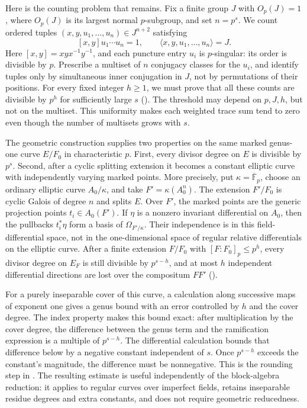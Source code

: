 Here is the counting problem that remains. Fix a finite group $J$ with
$O_p(J)=1$, where $O_p(J)$ is its largest normal $p$-subgroup, and set
$n=p^s$. We count ordered tuples $(x,y,u_1,\ldots,u_n)\in J^{n+2}$
satisfying
\[
 [x,y]u_1\cdots u_n=1,\qquad
 \langle x,y,u_1,\ldots,u_n\rangle=J.
\]
Here $[x,y]=xyx^{-1}y^{-1}$, and each puncture entry $u_i$ is
$p$-singular: its order is divisible by $p$. Prescribe a multiset of
$n$ conjugacy classes for the $u_i$, and identify tuples only by
simultaneous inner conjugation in $J$, not by permutations of their
positions. For every fixed integer $h\geq1$, we must prove that all
these counts are divisible by $p^h$ for sufficiently large $s$
(). The threshold may depend on $p,J,h$,
but not on the multiset. This uniformity makes each weighted trace sum
tend to zero even though the number of multisets grows with $s$.

The geometric construction supplies two properties on the same marked
genus-one curve $E/F_0$ in characteristic $p$. First, every divisor
degree on $E$ is divisible by $p^s$. Second, after a cyclic splitting
extension it becomes a constant elliptic curve with independently
varying marked points. More precisely, put
$\kappa=\overline{\mathbb F}_p$, choose an ordinary elliptic curve
$A_0/\kappa$, and take $F'=\kappa(A_0^n)$. The extension $F'/F_0$
is cyclic Galois of degree $n$ and splits $E$. Over $F'$, the marked points are the
generic projection points $t_i\in A_0(F')$. If $\eta$ is a nonzero
invariant differential on $A_0$, then the pullbacks $t_i^*\eta$
form a basis of $\Omega_{F'/\kappa}$. Their independence is in this
field-differential space, not in the one-dimensional space of regular
relative differentials on the elliptic curve. After a finite extension
$F/F_0$ with $[F:F_0]_p\leq p^h$, every divisor degree on $E_F$
is still divisible by $p^{s-h}$, and at most $h$ independent
differential directions are lost over the compositum $FF'$
().

For a purely inseparable cover of this curve, a calculation along
successive maps of exponent one gives a genus bound with an error controlled
by $h$ and the cover degree. The index property makes this bound exact:
after multiplication by the cover degree, the difference between the
genus term and the ramification expression is a multiple of $p^{s-h}$.
The differential calculation bounds that difference below by a negative
constant independent of $s$. Once $p^{s-h}$ exceeds the constant's
magnitude, the difference must be nonnegative. This is the rounding
step in . The resulting estimate is useful
independently of the block-algebra reduction: it applies to regular
curves over imperfect fields, retains inseparable residue degrees and
extra constants, and does not require geometric reducedness.

